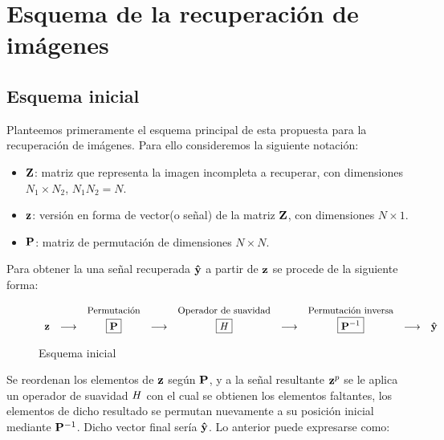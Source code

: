 \chapter{Esquema de la recuperaci\'on de im\'agenes}\label{chapter:SCHEME}

\section{Esquema inicial}
Planteemos primeramente el esquema principal de esta propuesta para la recuperaci\'on de im\'agenes. Para ello consideremos la siguiente notaci\'on:

\begin{itemize}
	\item $\Z$: matriz que representa la imagen incompleta a recuperar, con dimensiones $N_1 \times N_2$, $N_1N_2 = N$.
	\item $\z$: versión en forma de vector(o señal) de la matriz $\Z$, con dimensiones $N \times 1$.
	\item $\P$: matriz de permutaci\'on de dimensiones $N \times N$.
\end{itemize}

Para obtener la una señal recuperada $\yhat$ a partir de $\z$ se procede de la siguiente forma:

\qquad

\begin{figure}[h]
	\centering
	\begin{equation*}
		\begin{array}[t]{ccccccccc}
		& & \mbox{\small{Permutaci\'on}} & & \mbox{\small{Operador de suavidad}} & & \mbox{\small{Permutaci\'on inversa}} & &\\
		\z & \longrightarrow & \boxed{\P} & \longrightarrow & \boxed{\H} & \longrightarrow & \boxed{\P^{-1}} & \longrightarrow & \yhat \\
		\end{array}
	\end{equation*}
	\caption{Esquema inicial}
	\label{fig:init_scheme}
\end{figure}

\qquad

Se reordenan los elementos de $\z$ seg\'un $\P$, y a la señal resultante $\z^p$ se le aplica un operador de suavidad $\H$ con el cual se obtienen los elementos faltantes, los elementos de dicho resultado se permutan nuevamente a su posici\'on inicial mediante $\P^{-1}$. Dicho vector final ser\'ia $\yhat$. Lo anterior puede expresarse como:

